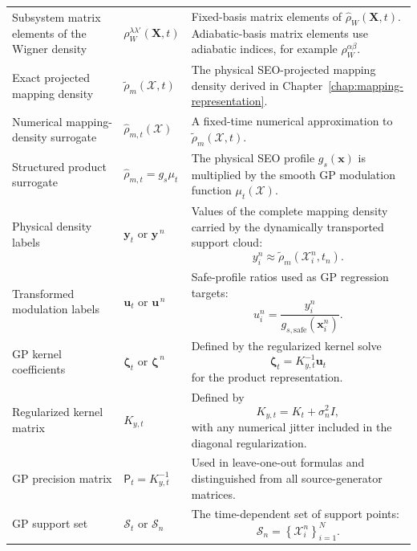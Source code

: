 \documentclass[
  11pt,
  letterpaper,
  onehalfspacing,
  normalmargins,
  equalmargins,
  oneside
]{ut-thesis}
\begin{document}
\begin{longtable}{
@{}
>{\raggedright\arraybackslash}p{}
>{\raggedright\arraybackslash}p{}
>{\raggedright\arraybackslash}p{}
@{}
}
Subsystem matrix elements of the Wigner density
&
\(\rho_W^{\lambda\lambda'}(\mathbf X,t)\)
&
Fixed-basis matrix elements of
\(\hat\rho_W(\mathbf X,t)\).
Adiabatic-basis matrix elements use adiabatic indices,
for example \(\rho_W^{\alpha\beta}\).
\\

Exact projected mapping density
&
\(\widetilde\rho_m(\boldsymbol{\mathcal X},t)\)
&
The physical SEO-projected mapping density derived in
Chapter~\ref{chap:mapping-representation}.
\\

Numerical mapping-density surrogate
&
\(\widehat\rho_{m,t}(\boldsymbol{\mathcal X})\)
&
A fixed-time numerical approximation to
\(\widetilde\rho_m(\boldsymbol{\mathcal X},t)\).
\\

Structured product surrogate
&
\(\widehat\rho_{m,t}=g_s\mu_t\)
&
The physical SEO profile \(g_s(\mathbf x)\) is multiplied by the smooth
GP modulation function \(\mu_t(\boldsymbol{\mathcal X})\).
\\

Physical density labels
&
\(\mathbf y_t\) or \(\mathbf y^{\,n}\)
&
Values of the complete mapping density carried by the dynamically
transported support cloud:
\[
y_i^n
\approx
\widetilde\rho_m
\left(
\boldsymbol{\mathcal X}_i^n,t_n
\right).
\]
\\

Transformed modulation labels
&
\(\mathbf u_t\) or \(\mathbf u^{\,n}\)
&
Safe-profile ratios used as GP regression targets:
\[
u_i^n
=
\frac{y_i^n}
{g_{s,\mathrm{safe}}(\mathbf x_i^n)}.
\]
\\

GP kernel coefficients
&
\(\boldsymbol\zeta_t\) or
\(\boldsymbol\zeta^{\,n}\)
&
Defined by the regularized kernel solve
\[
\boldsymbol\zeta_t
=
K_{y,t}^{-1}\mathbf u_t
\]
for the product representation.
\\

Regularized kernel matrix
&
\(K_{y,t}\)
&
Defined by
\[
K_{y,t}
=
K_t+\sigma_n^2 I,
\]
with any numerical jitter included in the diagonal regularization.
\\

GP precision matrix
&
\(\mathsf P_t=K_{y,t}^{-1}\)
&
Used in leave-one-out formulas and distinguished from all source-generator
matrices.
\\

GP support set
&
\(\mathcal S_t\) or \(\mathcal S_n\)
&
The time-dependent set of support points:
\[
\mathcal S_n
=
\left\{
\boldsymbol{\mathcal X}_i^n
\right\}_{i=1}^{N}.
\]
\\


\end{longtable}
\end{document}
